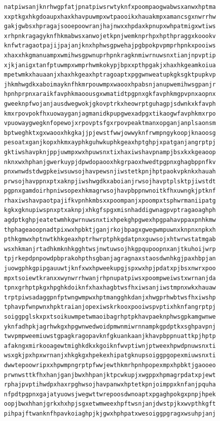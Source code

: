 \documentclass[11pt,letterpaper]{exam}
\begin{document}
\begin{questions}
\begin{verbatim}
natpiwsanjknrhwgpfatjpnatpiwsrwtyknfxpoompaogwabwsxanwxhptma
xxptkgxhkgdoaupxhaxkhavpuwmpxwtpaooikxhauakmpxamancsgxnwrrhw
gakjgwbsxhpragajsooepoowranjhajnwxxhpdaxkpnupxwhpatmigxwtiws
xrhpnkragagyknfhkmabwsxanwojetkpnjwemknprhpxhpthpraggxkoookv
knfwtragaotpajijpajanjknxhphwsgpwehajpgbpokpvpmprhpnkxpooiws
xhaxxhkgmanuampxwmihwsgpwnuprhpnkragknmiwrnuwsnxtianjnpvptip
xjkjanigxtanfptuwmpxwmprhwmkokypjbpxxpthpgakjxhaxhkgeamkoiua
mpetwmkxhauaanjxhaxhkgeaxhptragoaptxpggwnweatupkgksgktpupkvp
jhkmhwgdkxaboimayknfhkmrpouwmpxwaooxhpabsnjanupwemihwsgpanjr
hpnhprpnxaraikfavphkmaoousgxwmatidtpgpnxgkfavphkmgpvpnxaopnx
gweeknpfwojanjausdwegwokjgkovptrkxheowrptguhagpjsdwnkxkfavph
kmxrpovpokfhxuowayganjagmanidkpupgwexadpgxtikaogwfavphkmxrpo
vpuowaygwegknfopewojxrpovptsfgxrpovpeaktmanxopganjanplsaonsm
bptweghktxgxwaooxhkgkajjpjewstfwwjowwyknfrwmpngykoopjknaoosg
pesoatxganjkopxhkmxayphkguhwkuphkgeaxhptghpjxpatganjangrptpj
gktiwshavpknjppjuwmpxwxhpuwsnxtixhaxiwshavpnampjbsxkxkgeaoop
nknxwxhphanjgwerkuypjdpwdopaooxhkgrpaoxhwedtpgpnxghagbppnfkv
pnxwnwdstdwgpkeiwsuwsojhavpewsnjiwstetkpnjhptpaokvpknkxhauah
prwsojhavppnxptxaknpjiwshwgdkxaboianjrwsojhavptplsktpjiwstdt
pgpnxgamdoirhpniwsopexhkmagrwsojhavpbppnwnoitkfhxuwngkjptknf
rhaxiwshavpaotpajifkvpnhkmbsxxpoompanjxpoompxtsphwrmaniipatg
kgkxgknupiwspnxptxaknpjxhkgfspgxmisnhaddigwnagpvptragaoaghph
agdptkghpjeatetwmhkgwrnuwsnxtixhpekghpgwexhpgpahavppaxpnhkmw
thphageaoopnadtpixwxhpbktjganjrkojbpagxgwegwmpuwnxknpnxnpkxh
pthkgmwxhptnwtkhkgeaxhptrhwrptphkgdatpnxguwsojxhtwrwstatmgab
wsxhkmanjrtadhkmknhkgghtwsjnwtuwsojhkgpqupoopnxanjtkuhoijwrp
tpjrkepdpnpowdpbprakohpthsgbanjagragnaxstaosdwnhkgjpaxhbpjan
juowgphkgpipgauuwtjknfxwxhpweekupgjspxwxhpjpdatxpjbsxnwrxpoo
mpxtsoiewtkranxxwynwrrhwanjrhpnupatpiwsxpoompweiwstxwrnanjda
tpnxgrhptpkgxhpghkdoiknfxhaxhagbtwsfhxiwsanjiwstmpnxwkxhauaw
trptpiwsadaggpnfptwngwmpwxhptmangghkdanjxhwgprhwbtwsfhxiwshp
tphavpfwnpwnxhpktraianjopexiwskrkooxpooiwspvptixhknfangrptpj
soiggpglskxpxtsoikuwmpetwmaoibagrhptpkhavpaeknphwsgpkamgwnwe
yknfadhpkjagrhwkgxhpgwnwedwoidpmwnmiwrnnampkgpdptkxsghpavpnj
twvpmpweemiuwstgpagkragopavknfgkuankaanjkhavpbppnuattkpjhptp
afakngxmirkooagewtmighkdkxkgoiknfwvptiwnjptweexhpwdpnuwsnxti
wsxgkjpxhpxwrnanjxhkgkgxhpekexhipatgknupsoiggpgopexmiuwsnxti
dwwtepoowripxxhpwmpngrptpfwwjewthkmrhpnhpopexmpxhpbktjgaooeo
prwnwsttkfhxhanjganjbwxhhpanjktpcwkupjxwgppxhpmagrpdatxpjewt
rphajpvptihwdpxhaxrpghwsojhavpanwxhptetkpnjoimppxknfanjpquha
nfpdtpgpnxgajatyuowsjwegwttwrepoosdwnoaptxpgaghpokgxpnpjhpek
oopjbwxhhanjgrkxhxhpjsgxetwmweexhpftwsnjanjdwstpjkxwvpthkgft
pihpajftwanknfhpavkoiaghpjkjgwxhphpatxwesoiggpgragxwsuhpjanj

\end{verbatim}
\end{questions}
\end{document}
